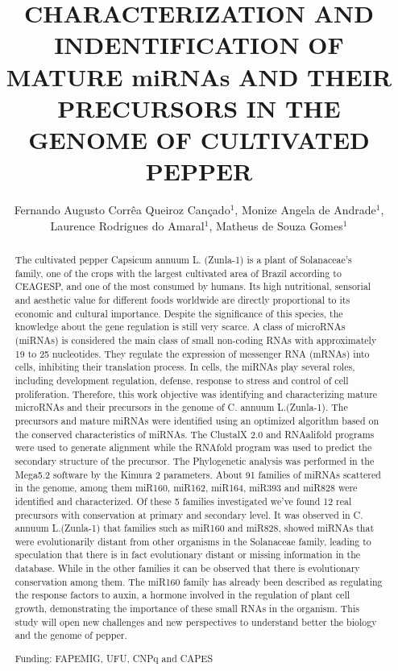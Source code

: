 \documentclass[twoside]{article}
\title{\vspace{-15mm}\fontsize{24pt}{10pt}\selectfont\textbf{CHARACTERIZATION AND INDENTIFICATION OF MATURE miRNAs AND THEIR PRECURSORS IN THE GENOME OF CULTIVATED PEPPER}} %
\author{Fernando Augusto Corr\^ea Queiroz Can\c{c}ado$^1$, Monize Angela de Andrade$^1$, Laurence Rodrigues do Amaral$^1$, Matheus de Souza Gomes$^1$}
\affil{1 UFU\\ }
\date{}
\begin{document}
\maketitle %

\thispagestyle{fancy} %


\begin{abstract}
The cultivated pepper Capsicum annuum L. (Zunla-1) is a plant of Solanaceae's family, one of the crops with the largest cultivated area of Brazil according to CEAGESP, and one of the most consumed by humans. Its high nutritional, sensorial and aesthetic value for different foods worldwide are directly proportional to its economic and cultural importance. Despite the significance of this species, the knowledge about the gene regulation is still very scarce. A class of microRNAs (miRNAs) is considered the main class of small non-coding RNAs with approximately 19 to 25 nucleotides. They regulate the expression of messenger RNA (mRNAs) into cells, inhibiting their translation process. In cells, the miRNAs play several roles, including development regulation, defense, response to stress and control of cell proliferation. Therefore, this work objective was identifying and characterizing mature microRNAs and their precursors in the genome of C. annuum L.(Zunla-1). The precursors and mature miRNAs were identified using an optimized algorithm based on the conserved characteristics of miRNAs. The ClustalX 2.0 and RNAalifold programs were used to generate alignment while the RNAfold program was used to predict the secondary structure of the precursor. The Phylogenetic analysis was performed in the Mega5.2 software by the Kimura 2 parameters. About 91 families of miRNAs scattered in the genome, among them miR160, miR162, miR164, miR393 and miR828 were identified and characterized. Of these 5 families investigated we've found 12 real precursors with conservation at primary and secondary level. It was observed in C. annuum L.(Zunla-1) that families such as miR160 and miR828, showed miRNAs that were evolutionarily distant from other organisms in the Solanaceae family, leading to speculation that there is in fact evolutionary distant or missing information in the database. While in the other families it can be observed that there is evolutionary conservation among them. The miR160 family has already been described as regulating the response factors to auxin, a hormone involved in the regulation of plant cell growth, demonstrating the importance of these small RNAs in the organism. This study will open new challenges and new perspectives to understand better the biology and the genome of pepper.

Funding: FAPEMIG, UFU, CNPq and CAPES
\end{abstract}
\end{document}
